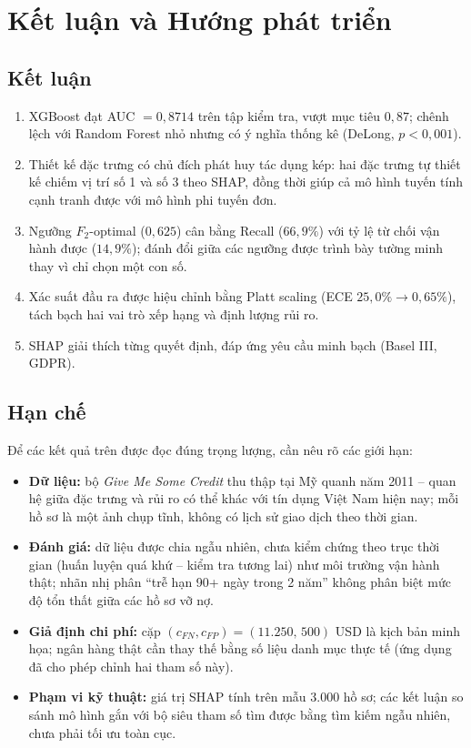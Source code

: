 \documentclass[12pt,a4paper,oneside]{report}
\theoremstyle{vnplain}
\theoremstyle{vndef}
\begin{document}
\chapter{Kết luận và Hướng phát triển}\label{ch:ketluan}

\section{Kết luận}
\begin{enumerate}
  \item XGBoost đạt AUC $=0{,}8714$ trên tập kiểm tra, vượt mục tiêu $0{,}87$; chênh
        lệch với Random Forest nhỏ nhưng có ý nghĩa thống kê (DeLong, $p<0{,}001$).
  \item Thiết kế đặc trưng có chủ đích phát huy tác dụng kép: hai đặc trưng tự thiết kế
        chiếm vị trí số 1 và số 3 theo SHAP, đồng thời giúp cả mô hình tuyến tính cạnh
        tranh được với mô hình phi tuyến đơn.
  \item Ngưỡng $F_2$-optimal ($0{,}625$) cân bằng Recall ($66{,}9\%$) với tỷ lệ từ chối
        vận hành được ($14{,}9\%$); đánh đổi giữa các ngưỡng được trình bày tường minh
        thay vì chỉ chọn một con số.
  \item Xác suất đầu ra được hiệu chỉnh bằng Platt scaling (ECE $25{,}0\%\to 0{,}65\%$),
        tách bạch hai vai trò xếp hạng và định lượng rủi ro.
  \item SHAP giải thích từng quyết định, đáp ứng yêu cầu minh bạch (Basel III, GDPR).
\end{enumerate}

\section{Hạn chế}
Để các kết quả trên được đọc đúng trọng lượng, cần nêu rõ các giới hạn:
\begin{itemize}
  \item \textbf{Dữ liệu:} bộ \emph{Give Me Some Credit} thu thập tại Mỹ quanh năm 2011
        -- quan hệ giữa đặc trưng và rủi ro có thể khác với tín dụng Việt Nam hiện nay;
        mỗi hồ sơ là một ảnh chụp tĩnh, không có lịch sử giao dịch theo thời gian.
  \item \textbf{Đánh giá:} dữ liệu được chia ngẫu nhiên, chưa kiểm chứng theo trục thời
        gian (huấn luyện quá khứ -- kiểm tra tương lai) như môi trường vận hành thật;
        nhãn nhị phân ``trễ hạn 90+ ngày trong 2 năm'' không phân biệt mức độ tổn thất
        giữa các hồ sơ vỡ nợ.
  \item \textbf{Giả định chi phí:} cặp $(c_{FN},c_{FP})=(11.250,\,500)$ USD là kịch bản
        minh họa; ngân hàng thật cần thay thế bằng số liệu danh mục thực tế (ứng dụng đã
        cho phép chỉnh hai tham số này).
  \item \textbf{Phạm vi kỹ thuật:} giá trị SHAP tính trên mẫu $3.000$ hồ sơ; các kết
        luận so sánh mô hình gắn với bộ siêu tham số tìm được bằng tìm kiếm ngẫu nhiên,
        chưa phải tối ưu toàn cục.
\end{itemize}
\end{document}
